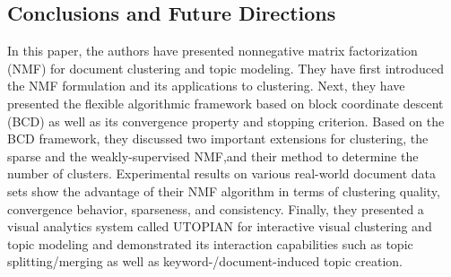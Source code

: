 \documentclass[11pt, oneside]{article}   	%
\begin{document}
\begin{Large}
\section{Conclusions and Future Directions}
In this paper, the authors have presented nonnegative matrix factorization (NMF) for document clustering and topic modeling. They have first introduced the NMF formulation and its applications to clustering. Next, they have presented the flexible algorithmic framework based on block coordinate descent (BCD) as well as its convergence property and stopping criterion. Based on the BCD framework, they discussed two important extensions for clustering, the sparse and the weakly-supervised NMF,and their method to determine the number of clusters. Experimental results on various real-world document data sets show the advantage of their NMF algorithm in terms of clustering quality, convergence behavior, sparseness, and consistency. Finally, they presented a visual analytics system called UTOPIAN for interactive visual clustering and topic modeling and demonstrated its interaction capabilities such as topic splitting/merging as well as keyword-/document-induced topic creation.



















\end{Large}
\end{document}
